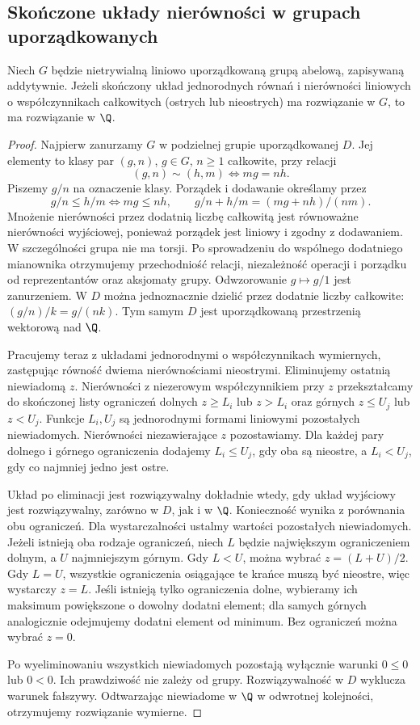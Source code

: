 \subsection{Skończone układy nierówności w grupach uporządkowanych}
\begin{lemat}
\label{lem:lst-fuzzy-ordered-linear-transfer}
Niech $G$ będzie nietrywialną liniowo uporządkowaną grupą
abelową, zapisywaną addytywnie. Jeżeli skończony układ
jednorodnych równań i nierówności liniowych o współczynnikach
całkowitych (ostrych lub nieostrych) ma rozwiązanie w $G$,
to ma rozwiązanie w $\Q$.
\end{lemat}
\begin{proof}
Najpierw zanurzamy $G$ w podzielnej grupie uporządkowanej
$D$. Jej elementy to klasy par $(g,n)$, $g\in G$,
$n\geq1$ całkowite, przy relacji
\[
 (g,n)\sim(h,m)\iff mg=nh.
\]
Piszemy $g/n$ na oznaczenie klasy. Porządek i dodawanie
określamy przez
\[
 g/n\leq h/m\iff mg\leq nh,\qquad
 g/n+h/m=(mg+nh)/(nm).
\]
Mnożenie nierówności przez dodatnią liczbę całkowitą
jest równoważne nierówności wyjściowej, ponieważ
porządek jest liniowy i zgodny z dodawaniem.
W szczególności grupa nie ma torsji.
Po sprowadzeniu do wspólnego dodatniego mianownika
otrzymujemy przechodniość relacji, niezależność operacji
i porządku od reprezentantów oraz aksjomaty grupy.
Odwzorowanie $g\mapsto g/1$ jest zanurzeniem.
W $D$ można jednoznacznie dzielić przez dodatnie liczby
całkowite: $(g/n)/k=g/(nk)$. Tym samym $D$ jest
uporządkowaną przestrzenią wektorową nad $\Q$.

Pracujemy teraz z układami jednorodnymi o współczynnikach
wymiernych, zastępując równość dwiema nierównościami
nieostrymi. Eliminujemy ostatnią niewiadomą $z$.
Nierówności z niezerowym współczynnikiem przy $z$
przekształcamy do skończonej listy ograniczeń dolnych
$z\geq L_i$ lub $z>L_i$ oraz górnych $z\leq U_j$
lub $z<U_j$. Funkcje $L_i,U_j$ są jednorodnymi
formami liniowymi pozostałych niewiadomych.
Nierówności niezawierające $z$ pozostawiamy.
Dla każdej pary dolnego i górnego ograniczenia
dodajemy $L_i\leq U_j$, gdy oba są nieostre,
a $L_i<U_j$, gdy co najmniej jedno jest ostre.

Układ po eliminacji jest rozwiązywalny dokładnie wtedy,
gdy układ wyjściowy jest rozwiązywalny, zarówno w $D$,
jak i w $\Q$. Konieczność wynika z porównania obu
ograniczeń. Dla wystarczalności ustalmy wartości
pozostałych niewiadomych. Jeżeli istnieją oba rodzaje
ograniczeń, niech $L$ będzie największym ograniczeniem
dolnym, a $U$ najmniejszym górnym. Gdy $L<U$,
można wybrać $z=(L+U)/2$. Gdy $L=U$, wszystkie
ograniczenia osiągające te krańce muszą być nieostre,
więc wystarczy $z=L$. Jeśli istnieją tylko ograniczenia
dolne, wybieramy ich maksimum powiększone o dowolny
dodatni element; dla samych górnych analogicznie
odejmujemy dodatni element od minimum. Bez ograniczeń
można wybrać $z=0$.

Po wyeliminowaniu wszystkich niewiadomych pozostają
wyłącznie warunki $0\leq0$ lub $0<0$.
Ich prawdziwość nie zależy od grupy.
Rozwiązywalność w $D$ wyklucza warunek fałszywy.
Odtwarzając niewiadome w $\Q$ w odwrotnej kolejności,
otrzymujemy rozwiązanie wymierne.
\end{proof}
